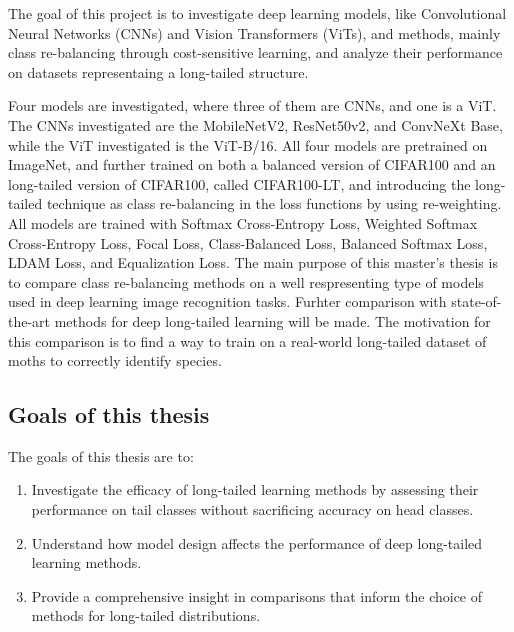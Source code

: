 The goal of this project is to investigate deep learning models, like Convolutional Neural Networks (CNNs) and Vision Transformers (ViTs), and methods, mainly class re-balancing through cost-sensitive learning, and analyze their performance on datasets representaing a long-tailed structure.  

Four models are investigated, where three of them are CNNs, and one is a ViT. The CNNs investigated are the MobileNetV2, ResNet50v2, and ConvNeXt Base, while the ViT investigated is the ViT-B/16. All four models are pretrained on ImageNet, and further trained on both a balanced version of CIFAR100 and an long-tailed version of CIFAR100, called CIFAR100-LT, and introducing the long-tailed technique as class re-balancing in the loss functions by using re-weighting. All models are trained with Softmax Cross-Entropy Loss, Weighted Softmax Cross-Entropy Loss, Focal Loss, Class-Balanced Loss, Balanced Softmax Loss, LDAM Loss, and Equalization Loss. The main purpose of this master's thesis is to compare class re-balancing methods on a well respresenting type of models used in deep learning image recognition tasks. Furhter comparison with state-of-the-art methods for deep long-tailed learning will be made. The motivation for this comparison is to find a way to train on a real-world long-tailed dataset of moths to correctly identify species.




\subsection{Goals of this thesis}
The goals of this thesis are to:

\begin{enumerate}
    \item Investigate the efficacy of long-tailed learning methods by assessing their performance on tail classes without sacrificing accuracy on head classes. 
    \item Understand how model design affects the performance of deep long-tailed learning methods.
    \item Provide a comprehensive insight in comparisons that inform the choice of methods for long-tailed distributions.
\end{enumerate}


